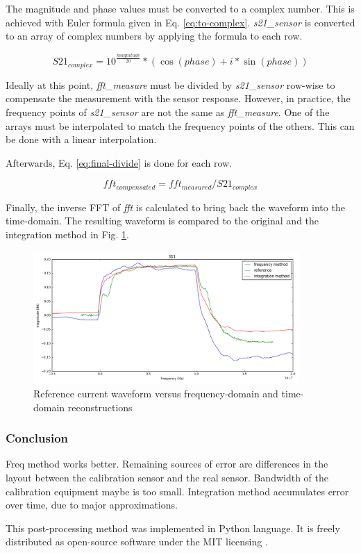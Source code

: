 The magnitude and phase values must be converted to a complex number.
This is achieved with Euler formula given in Eq. \ref{eq:to-complex}.
\textit{s21\_sensor} is converted to an array of complex numbers by applying the formula to each row.

\begin{equation} \label{eq:to-complex}
  S21_{complex} = 10^{\frac{magnitude}{20}} * (\cos(phase) + i*\sin(phase))
\end{equation}

Ideally at this point, \textit{fft\_measure} must be divided by \textit{s21\_sensor} row-wise to compensate the measurement with the sensor response.
However, in practice, the frequency points of \textit{s21\_sensor} are not the same as \textit{fft\_measure}.
One of the arrays must be interpolated to match the frequency points of the others.
This can be done with a linear interpolation.

Afterwards, Eq. \ref{eq:final-divide} is done for each row.

\begin{equation} \label{eq:final-divide}
  fft_{compensated} = fft_{measured} / S21_{complex}
\end{equation}

Finally, the inverse FFT of \textit{fft\compensated} is calculated to bring back the waveform into the time-domain.
The resulting waveform is compared to the original and the integration method in Fig. \ref{fig:freq-domain-reconstructed}.

\begin{figure}[!htbp]
  \centering
  \includegraphics[width=0.9\textwidth]{src/3/figures/final_comparison_reconstructions.png}
  \caption{Reference current waveform versus frequency-domain and time-domain reconstructions}
  \label{fig:freq-domain-reconstructed}
\end{figure}

\subsubsection{Conclusion}

Freq method works better.
Remaining sources of error are differences in the layout between the calibration sensor and the real sensor.
Bandwidth of the calibration equipment maybe is too small.
Integration method accumulates error over time, due to major approximations.


This post-processing method was implemented in Python language.
It is freely distributed \cite{nfs-repository} as open-source software under the MIT licensing \cite{mit-licensing}.
